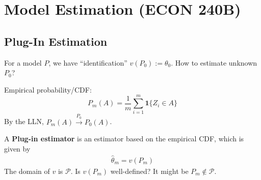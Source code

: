 \documentclass[11pt]{elegantbook}
\begin{document}
\section{Model Estimation (ECON 240B)}
\subsection{Plug-In Estimation}
For a model $P$, we have ``identification'' $v(P_0):=\theta_0$. How to estimate unknown $P_0$?

\begin{definition}
    \normalfont
    Empirical probability/CDF: $$P_m(A)=\frac{1}{m}\sum_{i=1}^m \mathbf{1}\{Z_i\in A\}$$
    By the LLN, $P_m(A) \stackrel{P_0}{\longrightarrow} P_0(A)$.
\end{definition}

\begin{definition}
    \normalfont
    A \textbf{Plug-in estimator} is an estimator based on the empirical CDF, which is given by
    \begin{equation}
        \begin{aligned}
            \hat{\theta}_m=v(P_m)
        \end{aligned}
        \nonumber
    \end{equation}
     The domain of $v$ is $\mathcal{P}$. Is $v(P_m)$ well-defined? It might be $P_m\notin \mathcal{P}$.
\end{definition}
\end{document}
